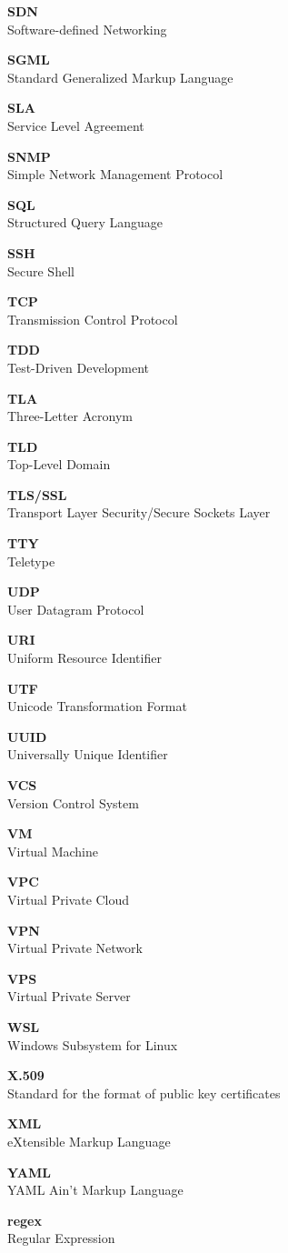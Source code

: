 \documentclass[a4paper]{article}
\newcommand{\AcronymRow}[2]{%
  \vfill
  \begin{center}
    {\fontsize{60}{72}\selectfont \textbf{#1}} \\[0.5em]
    {\Large #2}
  \end{center}
}
\begin{document}
\AcronymRow{SDN}{Software-defined Networking}
\AcronymRow{SGML}{Standard Generalized Markup Language}
\AcronymRow{SLA}{Service Level Agreement}
\AcronymRow{SNMP}{Simple Network Management Protocol}
\AcronymRow{SQL}{Structured Query Language}
\AcronymRow{SSH}{Secure Shell}
\AcronymRow{TCP}{Transmission Control Protocol}
\AcronymRow{TDD}{Test-Driven Development}
\AcronymRow{TLA}{Three-Letter Acronym}
\AcronymRow{TLD}{Top-Level Domain}
\AcronymRow{TLS/SSL}{Transport Layer Security/Secure Sockets Layer}
\AcronymRow{TTY}{Teletype}
\AcronymRow{UDP}{User Datagram Protocol}
\AcronymRow{URI}{Uniform Resource Identifier}
\AcronymRow{UTF}{Unicode Transformation Format}
\AcronymRow{UUID}{Universally Unique Identifier}
\AcronymRow{VCS}{Version Control System}
\AcronymRow{VM}{Virtual Machine}
\AcronymRow{VPC}{Virtual Private Cloud}
\AcronymRow{VPN}{Virtual Private Network}
\AcronymRow{VPS}{Virtual Private Server}
\AcronymRow{WSL}{Windows Subsystem for Linux}
\AcronymRow{X.509}{Standard for the format of public key certificates}
\AcronymRow{XML}{eXtensible Markup Language}
\AcronymRow{YAML}{YAML Ain't Markup Language}
\AcronymRow{regex}{Regular Expression}
\end{document}
